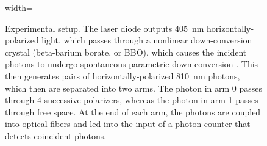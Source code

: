 \begin{figure}
\begin{adjustbox}{width=\linewidth}
    \end{adjustbox}

    \caption{Experimental setup. The laser diode outputs \qty{405}{\nano\meter} horizontally-polarized light, which passes through a nonlinear down-conversion crystal (beta-barium borate, or BBO), which causes the incident photons to undergo spontaneous parametric down-conversion \cite{qutoolsgmbhQuEDManual2021}. This then generates pairs of horizontally-polarized \qty{810}{\nano\meter} photons, which then are separated into two arms. The photon in arm 0 passes through 4 successive polarizers, whereas the photon in arm 1 passes through free space. At the end of each arm, the photons are coupled into optical fibers and led into the input of a photon counter that detects coincident photons.}\label{fig:expsetup}
\end{figure}
